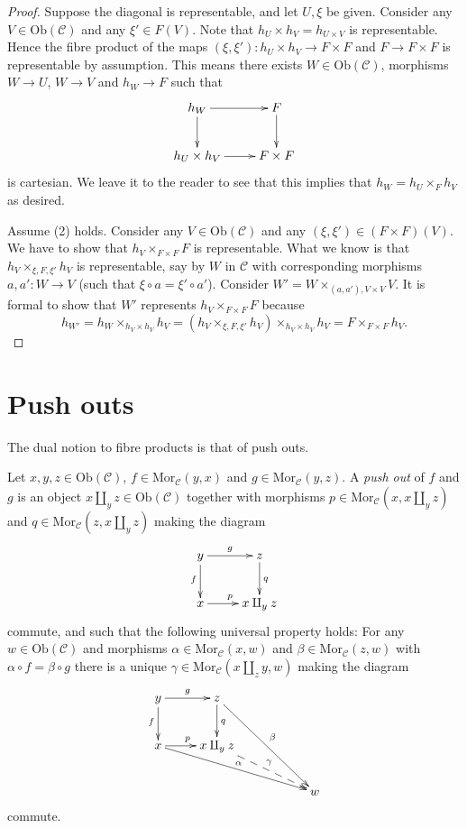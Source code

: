 \begin{proof}
Suppose the diagonal is representable, and let $U, \xi$ be given.
Consider any $V \in \text{Ob}(\mathcal{C})$ and any
$\xi' \in F(V)$. Note that $h_U \times h_V = h_{U \times V}$
is representable. Hence the fibre product of the maps
$(\xi, \xi') : h_U \times h_V \to F \times F$
and $F \to F \times F$ is representable by assumption.
This means there exists $W \in \text{Ob}(\mathcal{C})$,
morphisms $W \to U$, $W \to V$ and $h_W \to F$ such that
$$
\xymatrix{
h_{W} \ar[d] \ar[r] & F \ar[d] \\
h_U \times h_V \ar[r] & F \times F
}
$$
is cartesian. We leave it to the reader to see that this
implies that $h_W = h_U \times_F h_V$ as desired.

\medskip\noindent
Assume (2) holds. Consider any $V \in \text{Ob}(\mathcal{C})$
and any $(\xi, \xi') \in (F \times F)(V)$. We have to show that
$h_V \times_{F\times F} F$ is representable. What we know is that
$h_V \times_{\xi, F, \xi'} h_V$ is representable, say by $W$
in $\mathcal{C}$ with corresponding morphisms $a, a' : W \to V$
(such that $\xi \circ a = \xi' \circ a'$).
Consider $W' = W \times_{(a, a'), V\times V} V$.
It is formal to show that $W'$ represents $h_V \times_{F\times F} F$
because
$$
h_{W'} =  h_W \times_{h_V\times h_V} h_V
= (h_V \times_{\xi, F, \xi'} h_V) \times_{h_V\times h_V} h_V
= F \times_{F \times F} h_V.
$$
\end{proof}









\section{Push outs}
\label{section-pushouts}

\noindent
The dual notion to fibre products is that of push outs.

\begin{definition}
\label{definition-pushouts}
Let $x, y, z\in \text{Ob}(\mathcal{C})$,
$f\in \text{Mor}_{\mathcal{C}}(y, x)$
and $g\in \text{Mor}_{\mathcal C}(y, z)$.
A {\it push out} of $f$ and $g$ is
an object $x\amalg_y z\in \text{Ob}(\mathcal{C})$
together with morphisms
$p\in \text{Mor}_{\mathcal C}(x, x\amalg_y z)$ and
$q\in\text{Mor}_{\mathcal C}(z, x\amalg_y z)$ making the diagram
$$
\xymatrix{
y \ar[r]^{g} \ar[d]_{f}
&
z \ar[d]^{q}
\\
x \ar[r]^{p}
&
x\amalg_y z
}
$$
commute, and such that the following universal property holds:
For any $w\in \text{Ob}(\mathcal{C})$ and morphisms
$\alpha \in \text{Mor}_{\mathcal C}(x, w)$ and
$\beta \in \text{Mor}_{\mathcal{C}}(z, w)$ with
$\alpha \circ f = \beta \circ g$ there is a unique
$\gamma\in \text{Mor}_{\mathcal C}(x\amalg_z y, w)$ making
the diagram
$$
\xymatrix{
y \ar[r]^{g} \ar[d]_{f}
&
z \ar[d]^{q} \ar[rrdd]^\beta
&
&
\\
x \ar[r]^{p} \ar[rrrd]^\alpha
&
x\amalg_y z  \ar@{-->}[rrd]^\gamma
&
&
\\
&&&
w
}
$$
commute.
\end{definition}

